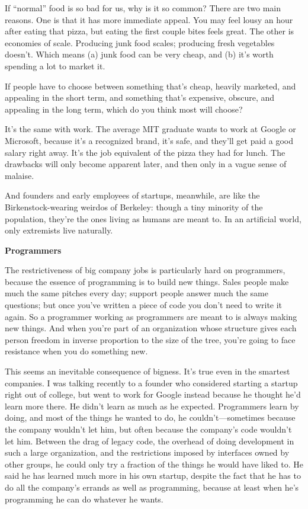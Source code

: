\documentclass[12pt]{book}
\begin{document}
If ``normal'' food is so bad for us, why is it so common? There are two
main reasons. One is that it has more immediate appeal. You may feel
lousy an hour after eating that pizza, but eating the first couple bites
feels great. The other is economies of scale. Producing junk food
scales; producing fresh vegetables doesn't. Which means (a) junk food
can be very cheap, and (b) it's worth spending a lot to market it.

If people have to choose between something that's cheap, heavily
marketed, and appealing in the short term, and something that's
expensive, obscure, and appealing in the long term, which do you think
most will choose?

It's the same with work. The average MIT graduate wants to work at
Google or Microsoft, because it's a recognized brand, it's safe, and
they'll get paid a good salary right away. It's the job equivalent of
the pizza they had for lunch. The drawbacks will only become apparent
later, and then only in a vague sense of malaise.

And founders and early employees of startups, meanwhile, are like the
Birkenstock-wearing weirdos of Berkeley: though a tiny minority of the
population, they're the ones living as humans are meant to. In an
artificial world, only extremists live naturally.

\textbf{Programmers}

The restrictiveness of big company jobs is particularly hard on
programmers, because the essence of programming is to build new things.
Sales people make much the same pitches every day; support people answer
much the same questions; but once you've written a piece of code you
don't need to write it again. So a programmer working as programmers are
meant to is always making new things. And when you're part of an
organization whose structure gives each person freedom in inverse
proportion to the size of the tree, you're going to face resistance when
you do something new.

This seems an inevitable consequence of bigness. It's true even in the
smartest companies. I was talking recently to a founder who considered
starting a startup right out of college, but went to work for Google
instead because he thought he'd learn more there. He didn't learn as
much as he expected. Programmers learn by doing, and most of the things
he wanted to do, he couldn't---sometimes because the company wouldn't
let him, but often because the company's code wouldn't let him. Between
the drag of legacy code, the overhead of doing development in such a
large organization, and the restrictions imposed by interfaces owned by
other groups, he could only try a fraction of the things he would have
liked to. He said he has learned much more in his own startup, despite
the fact that he has to do all the company's errands as well as
programming, because at least when he's programming he can do whatever
he wants.
\end{document}
